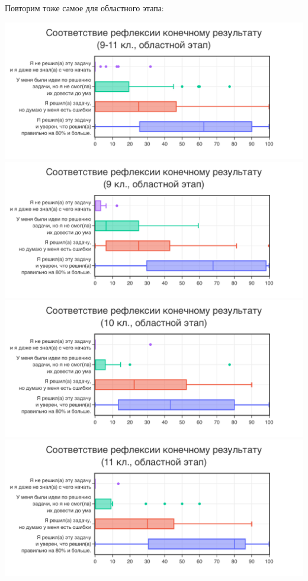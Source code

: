 Повторим тоже самое для областного этапа:

\includegraphics[width=\linewidth]{../export/pdf/selfassessment/oblast/allgrade-box.pdf}
\includegraphics[width=\linewidth]{../export/pdf/selfassessment/oblast/grade9-box.pdf}
\includegraphics[width=\linewidth]{../export/pdf/selfassessment/oblast/grade10-box.pdf}
\includegraphics[width=\linewidth]{../export/pdf/selfassessment/oblast/grade11-box.pdf}